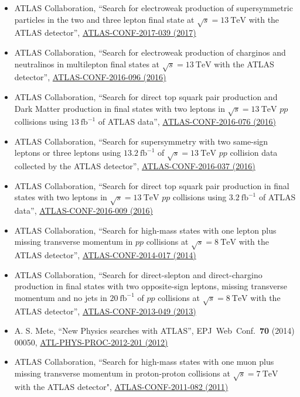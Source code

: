 \documentclass[a4paper,10pt]{article}
\begin{document}
\begin{itemize}
	\item ATLAS Collaboration,
	``Search for electroweak production of supersymmetric particles in the two and three lepton final state at $\sqrt{s}=13\ \mathrm{TeV}$ with the ATLAS detector'',
	\href{https://atlas.web.cern.ch/Atlas/GROUPS/PHYSICS/CONFNOTES/ATLAS-CONF-2017-039/}{ATLAS-CONF-2017-039 (2017)}
	\item ATLAS Collaboration,
	``Search for electroweak production of charginos and neutralinos in multilepton final states at $\sqrt{s}=13\ \mathrm{TeV}$ with the ATLAS detector'',
	\href{https://atlas.web.cern.ch/Atlas/GROUPS/PHYSICS/CONFNOTES/ATLAS-CONF-2016-096/}{ATLAS-CONF-2016-096 (2016)}
	\item ATLAS Collaboration, 
	``Search for direct top squark pair production and Dark Matter production in final states with two leptons in $\sqrt{s}=13\ \mathrm{TeV}$ $pp$ collisions using $13\ \mathrm{fb}^{-1}$ of ATLAS data'',
	\href{https://atlas.web.cern.ch/Atlas/GROUPS/PHYSICS/CONFNOTES/ATLAS-CONF-2016-076/}{ATLAS-CONF-2016-076 (2016)}
	\item ATLAS Collaboration,
	``Search for supersymmetry with two same-sign leptons or three leptons using $13.2\ \mathrm{fb}^{-1}$ of $\sqrt{s}=13\ \mathrm{TeV}$ $pp$ collision data collected by the ATLAS detector'',
	\href{https://atlas.web.cern.ch/Atlas/GROUPS/PHYSICS/CONFNOTES/ATLAS-CONF-2016-037/}{ATLAS-CONF-2016-037 (2016)} 
	\item ATLAS Collaboration, 
	``Search for direct top squark pair production in final states with two leptons in $\sqrt{s}=13\ \mathrm{TeV}$ $pp$ collisions using $3.2\ \mathrm{fb}^{-1}$ of ATLAS data'',
	\href{https://atlas.web.cern.ch/Atlas/GROUPS/PHYSICS/CONFNOTES/ATLAS-CONF-2016-009/}{ATLAS-CONF-2016-009 (2016)} 	
	\item ATLAS Collaboration, 
	``Search for high-mass states with one lepton plus missing transverse momentum in $pp$ collisions at $\sqrt{s}= 8\ \mathrm{TeV}$ with the ATLAS detector'',
	\href{https://atlas.web.cern.ch/Atlas/GROUPS/PHYSICS/CONFNOTES/ATLAS-CONF-2014-017/}{ATLAS-CONF-2014-017 (2014)} 
	\item ATLAS Collaboration, 
	``Search for direct-slepton and direct-chargino production in final states with two opposite-sign leptons, missing transverse momentum 
	and no jets in $20\ \mathrm{fb}^{-1}$ of $pp$ collisions at $\sqrt{s} = 8\ \mathrm{TeV}$ with the ATLAS detector'', 
	\href{https://atlas.web.cern.ch/Atlas/GROUPS/PHYSICS/CONFNOTES/ATLAS-CONF-2013-049/}{ATLAS-CONF-2013-049 (2013)} 
	\item A. S. Mete, 
	``New Physics searches with ATLAS'', 
	EPJ\ Web\ Conf.\ {\bf 70} (2014) 00050, 
	\href{https://cds.cern.ch/record/1478973}{ATL-PHYS-PROC-2012-201 (2012)}
	\item ATLAS Collaboration, 
	``Search for high-mass states with one muon plus missing transverse momentum in proton-proton collisions at $\sqrt{s} = 7\ \mathrm{TeV}$ with the ATLAS detector", 
	\href{https://atlas.web.cern.ch/Atlas/GROUPS/PHYSICS/CONFNOTES/ATLAS-CONF-2011-082/}{ATLAS-CONF-2011-082 (2011)}
\end{itemize}
\end{document}
